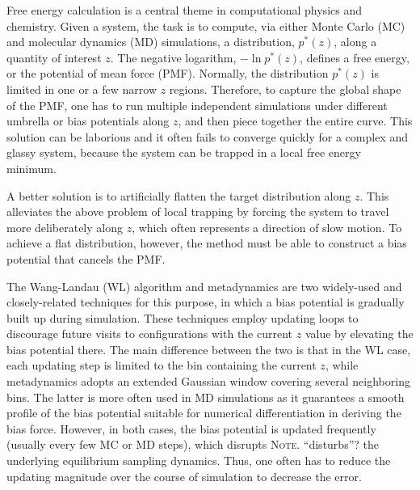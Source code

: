 \documentclass[reprint, floatfix]{revtex4-1}
\newcommand{\note}[1]{{\color{DarkGreen}\footnotesize \textsc{Note.} #1}}
\begin{document}
Free energy calculation\cite{frenkel, newman} is a central theme
in computational physics and chemistry.
%
Given a system,
the task is to compute,
via either Monte Carlo\cite{frenkel, newman, landau_binder} (MC)
and molecular dynamics\cite{frenkel, karplus2002} (MD) simulations,
a distribution, $p^*(z)$,
along a quantity of interest $z$.
%
The negative logarithm,
$-\ln p^*(z)$,
defines a free energy,
or the potential of mean force (PMF).
%
Normally, the distribution $p^*(z)$ is
limited in one or a few narrow $z$ regions.
%
Therefore, to capture the global shape
of the PMF,
one has to run multiple independent simulations
under different umbrella or bias potentials
along $z$\cite{mezei1987, berg1992, lee1993},
and then piece together the entire curve.
%
This solution can be laborious %
and it often fails to converge quickly
for a complex and glassy system,
because the system can be trapped
in a local free energy minimum.



A better solution is to artificially flatten
the target distribution along $z$\cite{mezei1987, berg1992, lee1993,
wang2001, wang2001pre, laio2002, laio2008, barducci2011, sutto2012}.
%
This alleviates the above problem of local trapping
by forcing the system to travel more
deliberately along $z$,
which often represents
a direction of slow motion.
%
To achieve a flat distribution, however,
the method must be able to construct a
bias potential that cancels the PMF.



The Wang-Landau (WL) algorithm\cite{wang2001, wang2001pre}
and meta\-dy\-nam\-ics\cite{huber1994, laio2002,
laio2008, barducci2011, sutto2012}
are two widely-used and closely-related\cite{micheletti2004}
techniques for this purpose,
in which a bias potential is gradually built up
during simulation.
%
These techniques employ updating loops
to discourage future visits to configurations
with the current $z$ value
by elevating the bias potential there.
%
The main difference between the two
is that in the WL case,
each updating step is limited to the bin
containing the current $z$,
while metadynamics adopts an extended
Gaussian window
covering several neighboring bins.
%
The latter is more often used in MD simulations
as it guarantees a smooth profile
of the bias potential
suitable for numerical differentiation
in deriving the bias force.
%
However, in both cases, the bias potential
is updated frequently (usually every few MC or MD steps),
which %
disrupts \note{``disturbs''?} the underlying
equilibrium sampling dynamics\cite{laio2002}.
%
Thus, one often has to reduce
the updating magnitude
over the course of simulation
to decrease the error.
\end{document}
